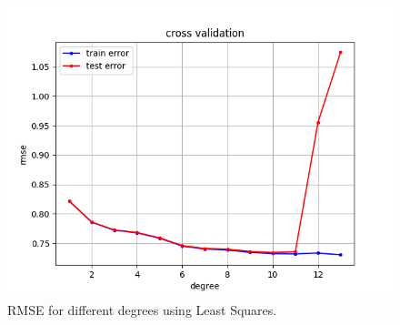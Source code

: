 \documentclass[10pt,conference,compsocconf]{IEEEtran}
\begin{document}
\begin{figure}[htbp]
  \centering
  \includegraphics[width=\columnwidth]{cross_validation_leastsquares.png}
  \caption{RMSE for different degrees using Least Squares.}
  \vspace{-3mm}
  \label{fig:crossvalidationleastsquares}
\end{figure}
\end{document}
